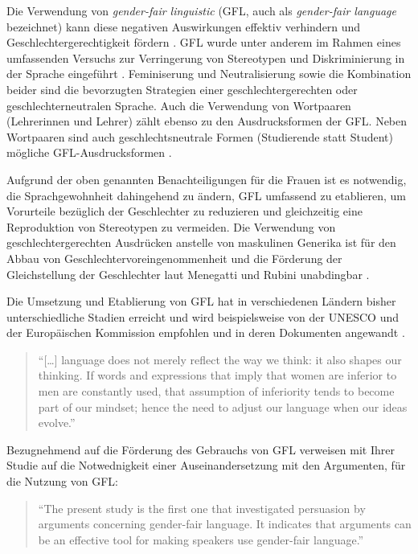 \documentclass[12pt, 
    twoside=false, 
    bibliography=totoc, 
    numbers=endperiod, 
    headings=normal, 
    toc=chapterentrydotfill
    ]{scrbook}
\begin{document}
Die Verwendung von \emph{gender-fair linguistic} (GFL, auch als \emph{gender-fair language} bezeichnet) kann diese negativen Auswirkungen effektiv verhindern und Geschlechtergerechtigkeit fördern \parencite[1]{menegatti_2017}.
GFL wurde unter anderem im Rahmen eines umfassenden Versuchs zur Verringerung von Stereotypen und Diskriminierung in der Sprache eingeführt \parencite[2]{sczesny_2016}.  Feminiserung und Neutralisierung sowie die Kombination beider sind die bevorzugten Strategien einer geschlechtergerechten oder geschlechterneutralen Sprache. Auch die Verwendung von Wortpaaren (Lehrerinnen und Lehrer) zählt ebenso zu den Ausdrucksformen der GFL. Neben Wortpaaren sind auch geschlechtsneutrale Formen (Studierende statt Student) mögliche GFL-Ausdrucksformen \parencite[2]{sczesny_2016}.


Aufgrund der oben genannten Benachteiligungen für die Frauen ist es notwendig, die Sprachgewohnheit dahingehend zu ändern, GFL umfassend zu etablieren, um Vorurteile bezüglich der Geschlechter zu reduzieren und gleichzeitig eine Reproduktion von Stereotypen zu vermeiden. Die Verwendung von geschlechtergerechten Ausdrücken anstelle von maskulinen Generika ist für den Abbau von Geschlechtervoreingenommenheit und die Förderung der Gleichstellung der Geschlechter laut Menegatti und Rubini unabdingbar \parencite*{menegatti_2017}.

Die Umsetzung und Etablierung von GFL hat in verschiedenen Ländern bisher unterschiedliche Stadien erreicht und wird beispielsweise von der UNESCO und der Europäischen Kommission empfohlen und in deren Dokumenten angewandt \parencite[4]{sczesny_2016}.

\citereset
\begin{quote}
    \enquote{[…] language does not merely reflect the way we think: it also shapes our thinking. If words and expressions that imply that women are inferior to men are constantly used, that assumption of inferiority tends to become part of our mindset; hence the need to adjust our language when our ideas evolve.} \parencite {unesco_2011}
\end{quote}

Bezugnehmend auf die Förderung des Gebrauchs von GFL verweisen \textcite{koeser_2014} mit Ihrer Studie auf die Notwednigkeit einer Auseinandersetzung mit den Argumenten, für die Nutzung von GFL:
\begin{quote}
    \enquote {The present study is the first one that investigated persuasion by arguments concerning gender-fair language. It indicates that arguments can be an effective tool for making speakers use gender-fair language.} \parencite[556]{koeser_2014}
\end{quote} 
\end{document}
